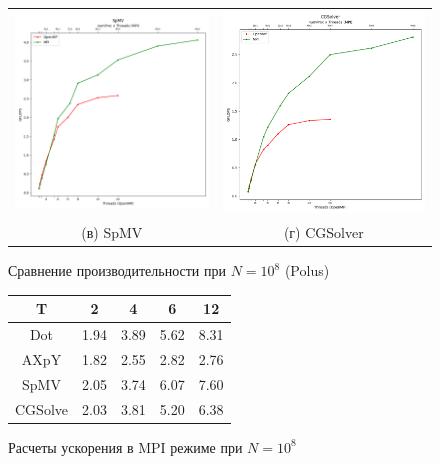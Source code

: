 \documentclass[12pt, a4paper]{article}
\begin{document}
\begin{figure}[H]
\begin{tabular}{cc}
		\includegraphics[width=85mm]{compare_spmv} & \includegraphics[width=85mm]{compare_cgsolver} \\
		(в) SpMV & (г) CGSolver \\[6pt]
	\end{tabular}
	\caption{Сравнение производительности при $N = 10^8$ (Polus)}
	\label{fig:mpi_flops_comapre} 
\end{figure}
\fi

\begin{figure}[H]
	\center
	\setlength{\tabcolsep}{6pt}
	\renewcommand{\arraystretch}{1.3}
	\begin{tabular}{|c|c|c|c|c|}
		\hline
		T & 2 & 4 & 6 & 12  \\
		\hline
		Dot & 1.94 & 3.89 & 5.62 & 8.31 \\
		\hline
		AXpY & 1.82 & 2.55 & 2.82 & 2.76 \\
		\hline
		SpMV & 2.05 & 3.74 & 6.07 & 7.60 \\
		\hline
		CGSolve & 2.03 & 3.81 & 5.20 & 6.38 \\
		\hline
	\end{tabular}
	\caption{Расчеты ускорения в MPI режиме при $N = 10^8$}
	\label{fig:speedup3}
\end{figure}
\end{document}
